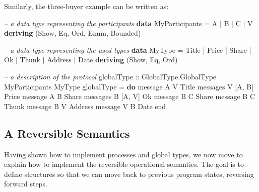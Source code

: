 \documentclass[runningheads,plain]{llncs}
\newenvironment{Shaded}{}{}
\newcommand{\KeywordTok}[1]{\textcolor[rgb]{0.00,0.44,0.13}{\textbf{#1}}}
\newcommand{\DataTypeTok}[1]{\textcolor[rgb]{0.56,0.13,0.00}{#1}}
\newcommand{\CommentTok}[1]{\textcolor[rgb]{0.38,0.63,0.69}{\textit{#1}}}
\newcommand{\OtherTok}[1]{\textcolor[rgb]{0.00,0.44,0.13}{#1}}
\newcommand{\FunctionTok}[1]{\textcolor[rgb]{0.02,0.16,0.49}{#1}}
\newcommand{\NormalTok}[1]{#1}
\begin{document}
\noindent
Similarly, the three-buyer example can be written as:
\begin{Shaded}
\begin{Highlighting}[]
\CommentTok{-- a data type representing the participants}
\KeywordTok{data} \DataTypeTok{MyParticipants} \FunctionTok{=} \DataTypeTok{A} \FunctionTok{|} \DataTypeTok{B} \FunctionTok{|} \DataTypeTok{C} \FunctionTok{|} \DataTypeTok{V} 
    \KeywordTok{deriving}\NormalTok{ (}\DataTypeTok{Show}\NormalTok{, }\DataTypeTok{Eq}\NormalTok{, }\DataTypeTok{Ord}\NormalTok{, }\DataTypeTok{Enum}\NormalTok{, }\DataTypeTok{Bounded}\NormalTok{)}

\CommentTok{-- a data type representing the used types }
\KeywordTok{data} \DataTypeTok{MyType} \FunctionTok{=} \DataTypeTok{Title} \FunctionTok{|} \DataTypeTok{Price} \FunctionTok{|} \DataTypeTok{Share} \FunctionTok{|} \DataTypeTok{Ok} \FunctionTok{|} \DataTypeTok{Thunk} \FunctionTok{|} \DataTypeTok{Address} \FunctionTok{|} \DataTypeTok{Date}
    \KeywordTok{deriving}\NormalTok{ (}\DataTypeTok{Show}\NormalTok{, }\DataTypeTok{Eq}\NormalTok{, }\DataTypeTok{Ord}\NormalTok{)}

\CommentTok{-- a description of the protocol}
\OtherTok{globalType ::} \DataTypeTok{GlobalType.GlobalType} \DataTypeTok{MyParticipants} \DataTypeTok{MyType}
\NormalTok{globalType }\FunctionTok{=} \KeywordTok{do} 
\NormalTok{    message }\DataTypeTok{A} \DataTypeTok{V} \DataTypeTok{Title} 
\NormalTok{    messages }\DataTypeTok{V}\NormalTok{ [}\DataTypeTok{A}\NormalTok{, }\DataTypeTok{B}\NormalTok{] }\DataTypeTok{Price} 
\NormalTok{    message }\DataTypeTok{A} \DataTypeTok{B} \DataTypeTok{Share} 
\NormalTok{    messages }\DataTypeTok{B}\NormalTok{ [}\DataTypeTok{A}\NormalTok{, }\DataTypeTok{V}\NormalTok{] }\DataTypeTok{Ok} 
\NormalTok{    message }\DataTypeTok{B} \DataTypeTok{C} \DataTypeTok{Share}
\NormalTok{    message }\DataTypeTok{B} \DataTypeTok{C} \DataTypeTok{Thunk}
\NormalTok{    message }\DataTypeTok{B} \DataTypeTok{V} \DataTypeTok{Address}
\NormalTok{    message }\DataTypeTok{V} \DataTypeTok{B} \DataTypeTok{Date}
\NormalTok{    end}
\end{Highlighting}
\end{Shaded}

\subsection{A Reversible Semantics}\label{a-reversible-semantics}
Having shown how to implement processes and global types, we now move to explain how to implement the  reversible operational semantics. The goal is to define structures so that we can move back to previous program states, reversing forward
steps.
\end{document}
